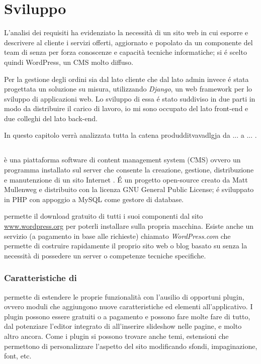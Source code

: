 \chapter{Sviluppo}
\label{chp:sviluppo}

L'analisi dei requisiti ha evidenziato la necessità di un sito web in cui esporre e descrivere al cliente i servizi offerti, aggiornato e popolato da un componente del team di {\fem} senza per forza conoscenze e capacità tecniche informatiche; si é scelto quindi WordPress, un CMS molto diffuso.

Per la gestione degli ordini sia dal lato cliente che dal lato admin invece é stata progettata un soluzione su misura, utilizzando \emph{Django}, un web framework per lo sviluppo di applicazioni web. Lo sviluppo di essa é stato suddiviso in due parti in modo da distribuire il carico di lavoro, io mi sono occupato del lato front-end e due colleghi del lato back-end.

In questo capitolo verrà analizzata tutta la catena produdditvavadlgja da ... a ... .

\section{{\wp}}
\label{sec:wp}

{\wp} è una piattaforma software di content management system (CMS) ovvero un programma installato sul server che consente la creazione, gestione, distribuzione e manutenzione di un sito Internet \cite{wordpress}. É un progetto open-source creato da Matt Mullenweg e distribuito con la licenza GNU General Public License; é sviluppato in PHP con appoggio a MySQL come gestore di database.

{\wp} permette il download gratuito di tutti i suoi componenti dal sito \url{www.wordpress.org} per poterli installare sulla propria macchina. Esiste anche un servizio (a pagamento in base alle richieste) chiamato \emph{WordPress.com} che permette di costruire rapidamente il proprio sito web o blog basato su {\wp} senza la necessità di possedere un server o competenze tecniche specifiche.

\subsection{Caratteristiche di {\wp}}

{\wp} permette di estendere le proprie funzionalità con l'ausilio di opportuni plugin, ovvero moduli che aggiungono nuove caratteristiche ed elementi all'applicativo. I plugin possono essere gratuiti o a pagamento e possono fare molte fare di tutto, dal potenziare l'editor integrato di {\wp} all'inserire slideshow nelle pagine, e molto altro ancora. Come i plugin si possono trovare anche temi, estensioni che permettono di personalizzare l'aspetto del sito modificando sfondi, impaginazione, font, etc.

